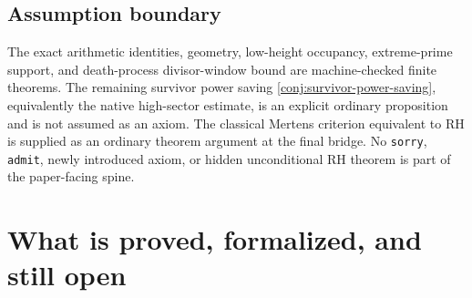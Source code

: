 \documentclass[11pt]{article}
\theoremstyle{definition}
\newcommand{\1}{\mathbf{1}}
\begin{document}
\subsection{Assumption boundary}

The exact arithmetic identities, geometry, low-height occupancy, extreme-prime support, and death-process divisor-window bound are machine-checked finite theorems.  The remaining survivor power saving \cref{conj:survivor-power-saving}, equivalently the native high-sector estimate, is an explicit ordinary proposition and is not assumed as an axiom.  The classical Mertens criterion equivalent to RH is supplied as an ordinary theorem argument at the final bridge.  No \texttt{sorry}, \texttt{admit}, newly introduced axiom, or hidden unconditional RH theorem is part of the paper-facing spine.

\section{What is proved, formalized, and still open}
\label{sec:status}
\end{document}
